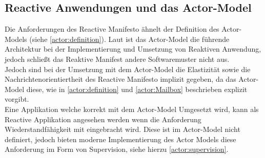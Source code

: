 \subsection{Reactive Anwendungen und das Actor-Model}
Die Anforderungen des {Reactive Manifesto} ähnelt der Definition des Actor-Models (siehe \ref{actor:definition}). Laut \cite{Vernon2015ReactiveAkka} ist das Actor-Model die führende Architektur bei der Implementierung und Umsetzung von Reaktiven Anwendung, jedoch schließt das Reaktive Manifest andere Softwaremuster nicht aus. \\
Jedoch sind bei der Umsetzung mit dem Actor-Model die Elastizität sowie die Nachrichtenorientiertheit des {Reactive Manifesto} implizit gegeben, da das Actor-Model diese, wie in \ref{actor:definition} und \ref{actor:Mailbox} beschrieben explizit vorgibt.\\
Eine Applikation welche korrekt mit dem Actor-Model Umgesetzt wird, kann als Reactive Applikation angesehen werden wenn die Anforderung {Wiederstandfähigkeit} mit eingebracht wird. Diese ist im Actor-Model nicht definiert, jedoch bieten moderne Implementierung des Actor Models diese Anforderung im Form von {Supervision}, siehe hierzu \ref{actor:supervision}.
